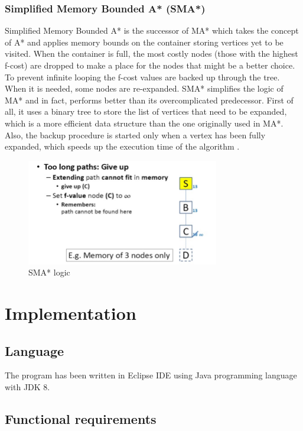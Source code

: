\documentclass[12pt]{article}
\begin{document}
\subsubsection{Simplified Memory Bounded A* (SMA*)}

Simplified Memory Bounded A* is the successor of MA* which takes the concept of A* and applies memory bounds on the container storing vertices yet to be visited. When the container is full, the most costly nodes (those with the highest f-cost) are dropped to make a place for the nodes that might be a better choice. To prevent infinite looping the f-cost values are backed up through the tree. When it is needed, some nodes are re-expanded. SMA* simplifies the logic of MA* and in fact, performs better than its overcomplicated predecessor. First of all, it uses a binary tree to store the list of vertices that need to be expanded, which is a more efficient data structure than the one originally used in MA*. Also, the backup procedure is started only when a vertex has been fully expanded, which speeds up the execution time of the algorithm \cite{GCAI2017:Enhanced_Simplified_Memory_bounded_Star}.

\begin{figure}[h]
    \includegraphics[width=0.75\textwidth]{smastar}
    \centering
    \caption{SMA* logic \cite{smastar_image}}
\end{figure}

\section{Implementation}

\subsection{Language}

The program has been written in Eclipse IDE using Java programming language with JDK 8.

\subsection{Functional requirements}
\end{document}
